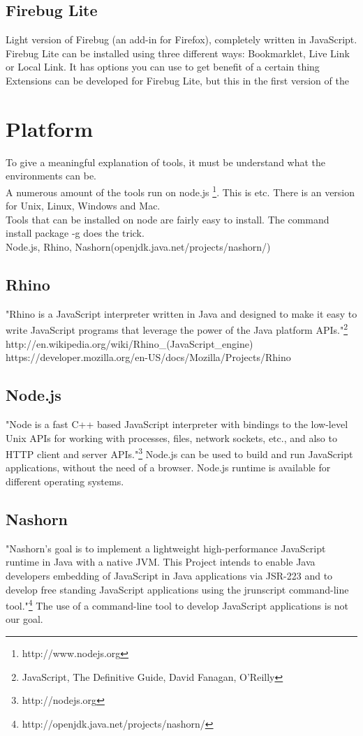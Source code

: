 \documentclass{article}
\begin{document}
\subsection {Firebug Lite}
Light version of Firebug (an add-in for Firefox), completely written in JavaScript.
Firebug Lite can be installed using three different ways: Bookmarklet, Live Link or Local Link.
It has options you can use to get benefit of a certain thing
Extensions can be developed for Firebug Lite, but this in the first version of the 

\section{Platform}
To give a meaningful explanation of tools, it must be understand what the environments can be.\\
A numerous amount of the tools run on node.js \footnote{http://www.nodejs.org}. This is etc.
There is an version for Unix, Linux, Windows and Mac.\\
Tools that can be installed on node are fairly easy to install. The command install package -g does the trick.\\
Node.js, Rhino, Nashorn(openjdk.java.net/projects/nashorn/)

\subsection{Rhino}
"Rhino is a JavaScript interpreter written in Java and designed to make it easy to write JavaScript programs that leverage the power of the Java platform APIs."\footnote{JavaScript, The Definitive Guide, David Fanagan, O'Reilly}\newline
http://en.wikipedia.org/wiki/Rhino\_(JavaScript\_engine)
https://developer.mozilla.org/en-US/docs/Mozilla/Projects/Rhino

\subsection{Node.js}
"Node is a fast C++ based JavaScript interpreter with bindings to the low-level 
Unix APIs for working with processes, files, network sockets, etc., and also to 
HTTP client and server APIs."\footnote{http://nodejs.org}
Node.js can be used to build and run JavaScript applications, without the need of a browser.
Node.js runtime is available for different operating systems.

\subsection{Nashorn}
"Nashorn's goal is to implement a lightweight high-performance JavaScript runtime in Java with a native JVM.
This Project intends to enable Java developers embedding of JavaScript in Java applications via JSR-223 and to develop 
free standing JavaScript applications using the jrunscript command-line tool."\footnote{http://openjdk.java.net/projects/nashorn/}
The use of a command-line tool to develop JavaScript applications is not our goal.
\end{document}
